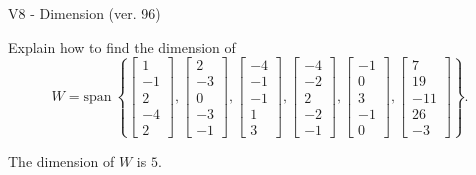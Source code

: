 \begin{exercise}
  \begin{exerciseTitle}V8 - Dimension (ver. 96)\end{exerciseTitle}
  \begin{exerciseStatement}
    Explain how to find the dimension of 
\[W=\mathrm{span}\ \left\{\left[\begin{array}{r}
1 \\
-1 \\
2 \\
-4 \\
2
\end{array}\right] , \left[\begin{array}{r}
2 \\
-3 \\
0 \\
-3 \\
-1
\end{array}\right] , \left[\begin{array}{r}
-4 \\
-1 \\
-1 \\
1 \\
3
\end{array}\right] , \left[\begin{array}{r}
-4 \\
-2 \\
2 \\
-2 \\
-1
\end{array}\right] , \left[\begin{array}{r}
-1 \\
0 \\
3 \\
-1 \\
0
\end{array}\right] , \left[\begin{array}{r}
7 \\
19 \\
-11 \\
26 \\
-3
\end{array}\right]\right\}.\]



  \end{exerciseStatement}
  \begin{exerciseAnswer}
   The dimension of \(W\) is  \(5\).
  


  \end{exerciseAnswer}
\end{exercise}